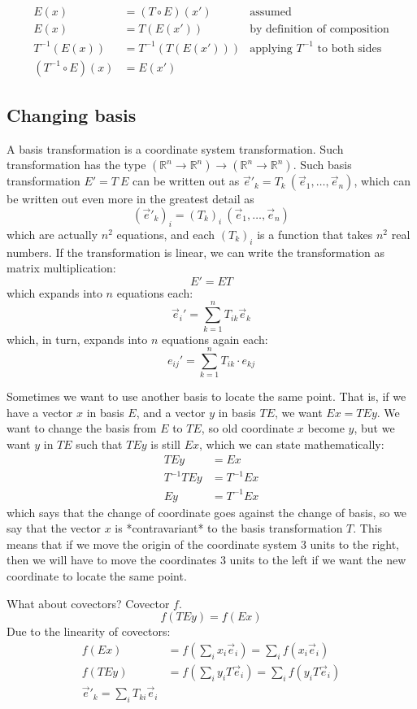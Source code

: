 \begin{align*}
    E(x) &= (T \circ E)(x') & \text{assumed}
    \\ E(x) &= T(E(x')) & \text{by definition of composition}
    \\ T^{-1}(E(x)) &= T^{-1}(T(E(x'))) & \text{applying \(T^{-1}\) to both sides}
    \\ (T^{-1}\circ E)(x) &= E(x')
\end{align*}

\subsection{Changing basis}

A basis transformation is a coordinate system transformation.
Such transformation has the type
$(\mathbb{R}^n \to \mathbb{R}^n) \to (\mathbb{R}^n \to \mathbb{R}^n)$.
Such basis transformation $E' = T~E$ can be written out
as $\vec{e}'_k = T_k~(\vec{e}_1, \ldots, \vec{e}_n)$,
which can be written out even more in the greatest detail as
\[
(\vec{e}'_k)_i = (T_k)_i~(\vec{e}_1, \ldots, \vec{e}_n)
\]
which are actually $n^2$ equations,
and each $(T_k)_i$ is a function that takes $n^2$ real numbers.
If the transformation is linear,
we can write the transformation as matrix multiplication:
\[
E' = ET
\]
which expands into $n$ equations each:
\[
\vec{e}_i' = \sum_{k=1}^n T_{ik} \vec{e}_k
\]
which, in turn, expands into $n$ equations again each:
\[
e_{ij}' = \sum_{k=1}^n T_{ik} \cdot e_{kj}
\]

Sometimes we want to use another basis to locate the same point.
That is, if we have a vector $x$ in basis $E$, and a vector $y$ in basis $TE$,
we want $Ex = TEy$.
We want to change the basis from $E$ to $TE$,
so old coordinate $x$ become $y$,
but we want $y$ in $TE$ such that $TEy$ is still $Ex$,
which we can state mathematically:
\begin{align*}
TEy &= Ex
\\ T^{-1}TEy &= T^{-1}Ex
\\ Ey &= T^{-1}Ex
\end{align*}
which says that the change of coordinate goes against the change of basis,
so we say that the vector $x$ is *contravariant* to the basis transformation $T$.
This means that if we move the origin of the coordinate system 3 units to the right,
then we will have to move the coordinates 3 units to the left
if we want the new coordinate to locate the same point.

What about covectors?
Covector $f$.
\[
f(TEy) = f(Ex)
\]
Due to the linearity of covectors:
\begin{align*}
f(Ex) &= f\left(\sum_i x_i \vec{e}_i\right) = \sum_i f(x_i \vec{e}_i)
\\ f(TEy) &= f\left(\sum_i y_i T\vec{e}_i \right) = \sum_i f(y_i T\vec{e}_i)
\\ \vec{e}'_k = \sum_i T_{ki} \vec{e}_i
\end{align*}

